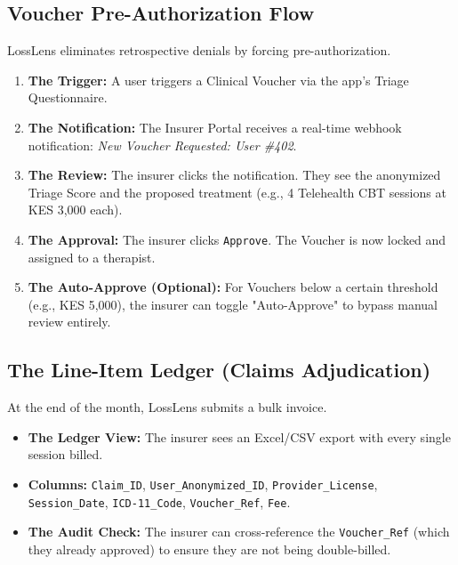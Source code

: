 \documentclass[11pt,a4paper]{article}
\begin{document}
\subsection{Voucher Pre-Authorization Flow}
LossLens eliminates retrospective denials by forcing pre-authorization.
\begin{enumerate}
    \item \textbf{The Trigger:} A user triggers a Clinical Voucher via the app's Triage Questionnaire.
    \item \textbf{The Notification:} The Insurer Portal receives a real-time webhook notification: \textit{New Voucher Requested: User \#402}.
    \item \textbf{The Review:} The insurer clicks the notification. They see the anonymized Triage Score and the proposed treatment (e.g., 4 Telehealth CBT sessions at KES 3,000 each).
    \item \textbf{The Approval:} The insurer clicks \texttt{Approve}. The Voucher is now locked and assigned to a therapist.
    \item \textbf{The Auto-Approve (Optional):} For Vouchers below a certain threshold (e.g., KES 5,000), the insurer can toggle "Auto-Approve" to bypass manual review entirely.
\end{enumerate}

\subsection{The Line-Item Ledger (Claims Adjudication)}
At the end of the month, LossLens submits a bulk invoice.
\begin{itemize}
    \item \textbf{The Ledger View:} The insurer sees an Excel/CSV export with every single session billed.
    \item \textbf{Columns:} \texttt{Claim\_ID}, \texttt{User\_Anonymized\_ID}, \texttt{Provider\_License}, \texttt{Session\_Date}, \texttt{ICD-11\_Code}, \texttt{Voucher\_Ref}, \texttt{Fee}.
    \item \textbf{The Audit Check:} The insurer can cross-reference the \texttt{Voucher\_Ref} (which they already approved) to ensure they are not being double-billed.
\end{itemize}
\end{document}

